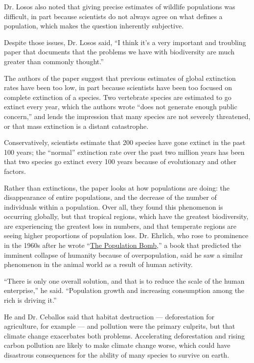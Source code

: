 Dr. Losos also noted that giving precise estimates of wildlife
populations was difficult, in part because scientists do not always
agree on what defines a population, which makes the question inherently
subjective.

Despite those issues, Dr. Losos said, ``I think it's a very important
and troubling paper that documents that the problems we have with
biodiversity are much greater than commonly thought.''

The authors of the paper suggest that previous estimates of global
extinction rates have been too low, in part because scientists have been
too focused on complete extinction of a species. Two vertebrate species
are estimated to go extinct every year, which the authors wrote ``does
not generate enough public concern,'' and lends the impression that many
species are not severely threatened, or that mass extinction is a
distant catastrophe.

Conservatively, scientists estimate that 200 species have gone extinct
in the past 100 years; the ``normal'' extinction rate over the past two
million years has been that two species go extinct every 100 years
because of evolutionary and other factors.

Rather than extinctions, the paper looks at how populations are doing:
the disappearance of entire populations, and the decrease of the number
of individuals within a population. Over all, they found this phenomenon
is occurring globally, but that tropical regions, which have the
greatest biodiversity, are experiencing the greatest loss in numbers,
and that temperate regions are seeing higher proportions of population
loss. Dr. Ehrlich, who rose to prominence in the 1960s after he wrote
``\href{https://www.nytimes3xbfgragh.onion/2015/06/01/us/the-unrealized-horrors-of-population-explosion.html?mcubz=1}{The
Population Bomb},'' a book that predicted the imminent collapse of
humanity because of overpopulation, said he saw a similar phenomenon in
the animal world as a result of human activity.

``There is only one overall solution, and that is to reduce the scale of
the human enterprise,'' he said. ``Population growth and increasing
consumption among the rich is driving it.''

He and Dr. Ceballos said that habitat destruction --- deforestation for
agriculture, for example --- and pollution were the primary culprits,
but that climate change exacerbates both problems. Accelerating
deforestation and rising carbon pollution are likely to make climate
change worse, which could have disastrous consequences for the ability
of many species to survive on earth.

